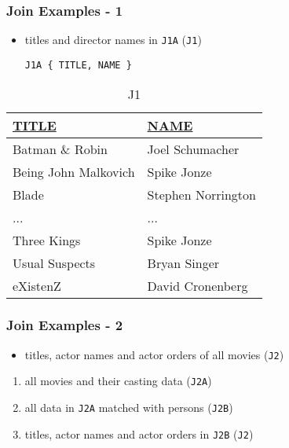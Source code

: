 \documentclass[dvipsnames]{beamer}
\theoremstyle{plain}
\begin{document}
\begin{frame}[fragile]
  \frametitle{Join Examples - 1}

  \begin{itemize}
    \item titles and director names in \texttt{J1A}
      (\texttt{J1})
    \begin{lstlisting}
J1A { TITLE, NAME }
    \end{lstlisting}
  \end{itemize}

  \vspace{-10pt}
  \begin{tiny}
  \begin{table}
    \caption{J1}
    \begin{tabular}{|l|l|}\hline
\underline{TITLE}    & \underline{NAME}\\[2pt]\hline\hline
Batman \& Robin      & Joel Schumacher \\\hline
Being John Malkovich & Spike Jonze     \\\hline
Blade                & Stephen Norrington\\\hline
...                  & ...             \\\hline
Three Kings          & Spike Jonze     \\\hline
Usual Suspects       & Bryan Singer    \\\hline
eXistenZ             & David Cronenberg\\\hline
    \end{tabular}
  \end{table}
  \end{tiny}
\end{frame}

\begin{frame}
  \frametitle{Join Examples - 2}

  \begin{itemize}
    \item titles, actor names and actor orders of all movies (\texttt{J2})
  \end{itemize}

  \pause
  \begin{enumerate}
    \item all movies and their casting data (\texttt{J2A})
    \item all data in \texttt{J2A} matched with persons (\texttt{J2B})
    \item titles, actor names and actor orders in \texttt{J2B} (\texttt{J2})
  \end{enumerate}
\end{frame}
\end{document}
